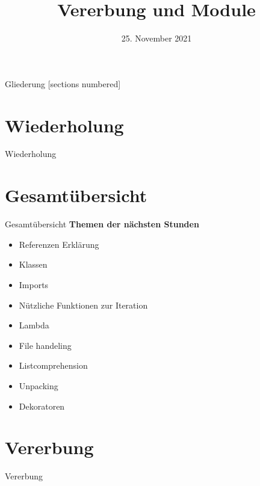 



\title{Vererbung und Module}
\date{25. November 2021}


	
\maketitle

\begin{frame}{Gliederung}
	[sections numbered]
	\tableofcontents
\end{frame}

\section{Wiederholung}
\begin{frame}{Wiederholung}
	
\end{frame}

\section{Gesamtübersicht}
\begin{frame}{Gesamtübersicht}
	\textbf{Themen der nächsten Stunden}
	\begin{itemize}
		\item Referenzen Erklärung
		\item  \alert{Klassen}
		\item \alert{Imports}
		\item Nützliche Funktionen zur Iteration
		\item Lambda
		\item File handeling
		\item Listcomprehension
		\item Unpacking
		\item Dekoratoren
	\end{itemize}
\end{frame}

\section{Vererbung}
\begin{frame}{Vererbung}
	
\end{frame}

